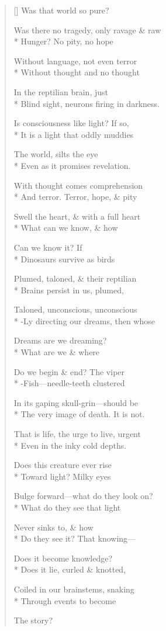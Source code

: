 \label{ch:the_age_of_dinosaurs}
\settowidth{\versewidth}{Was there no tragedy, only ravage \& raw}
\begin{verse}[\versewidth]
Was that world so pure?

Was there no tragedy, only ravage \& raw\\*
Hunger?     No pity, no hope

Without language, not even terror\\*
Without thought   and no thought

In the reptilian brain, just\\*
Blind sight, neurons firing in darkness.

Is consciousness like light?   If so,\\*
It is a light that oddly muddies

The world, silts the eye\\*
Even as it promises revelation.

With thought comes comprehension\\*
And terror. Terror, hope, \& pity

Swell the heart, \& with a full heart\\*
What can we know, \& how

Can we know it? \qquad If\\*
Dinosaurs survive as birds

Plumed, taloned, \& their reptilian\\*
Brains persist in us, plumed,

Taloned, unconscious, unconscious\\*
-Ly directing our dreams, then whose

Dreams are we dreaming?\\*
What are we \& where

Do we begin \& end?   The viper\\*
-Fish---needle-teeth clustered

In its gaping skull-grin---should be\\*
The very image of death. It is not.

That is life, the urge to live, urgent\\*
Even in the inky cold depths.

Does this creature ever rise\\*
Toward light? \qquad Milky eyes

Bulge forward---what do they look on?\\*
What do they see that light

Never sinks to,   \& how\\*
Do they see it?   That knowing---

Does it become knowledge?\\*
Does it lie, curled \& knotted,

Coiled in our brainstems, snaking\\*
Through events to become

The story?
\end{verse}
